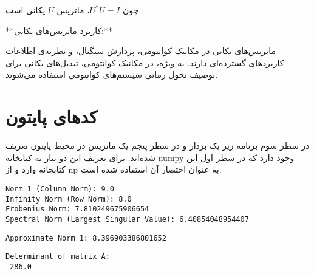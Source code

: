 چون \( U^* U = I \)، ماتریس \( U \) یکانی است.

**کاربرد ماتریس‌های یکانی:**

ماتریس‌های یکانی در مکانیک کوانتومی، پردازش سیگنال، و نظریه‌ی اطلاعات کاربردهای گسترده‌ای دارند. به ویژه، در مکانیک کوانتومی، تبدیل‌های یکانی برای توصیف تحول زمانی سیستم‌های کوانتومی استفاده می‌شوند.
\section{کدهای پایتون}
\begin{code}
	در سطر سوم برنامه زیر یک بردار و در سطر پنجم یک ماتریس در محیط پایتون تعریف شده‌اند. برای تعریف این دو نیاز به کتابخانه numpy وجود دارد که در سطر اول این کتابخانه وارد و از np به عنوان اختصار آن استفاده شده است.
	\begin{latin}
		  
	\end{latin}
\end{code}
\begin{code}
	\begin{latin}
		 
		\texttt{Norm 1 (Column Norm): 9.0\\
		Infinity Norm (Row Norm): 8.0\\
		Frobenius Norm: 7.810249675906654\\
		Spectral Norm (Largest Singular Value): 6.40854048954407 }
	\end{latin}
\end{code}

\begin{code}
	\begin{latin}
		  
		\texttt{Approximate Norm 1: 8.396903386801652}
	\end{latin}
\end{code}
\begin{code}
	\begin{latin}
		  
\texttt{Determinant of matrix A:\\
-286.0}
	\end{latin}
\end{code}

\begin{small}
	\begin{code}
	\begin{latin}
		  
	\end{latin}
\end{code}
\end{small}


